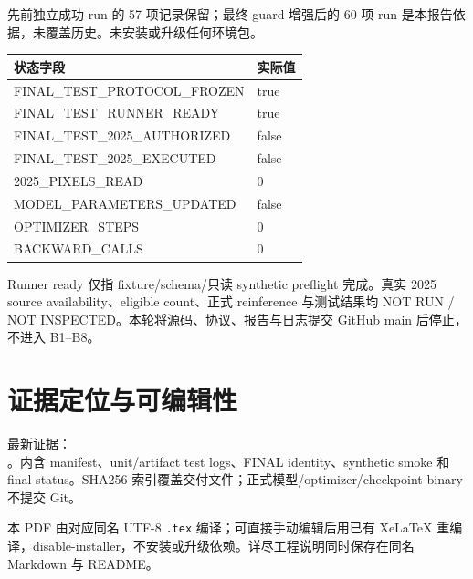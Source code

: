 \documentclass[UTF8,11pt,a4paper,fontset=windows]{ctexart}
\begin{document}
先前独立成功 run  的 57 项记录保留；最终 guard 增强后的 60 项 run 是本报告依据，未覆盖历史。未安装或升级任何环境包。

\begin{longtable}{p{111mm}l}
\textbf{状态字段} & \textbf{实际值}\\\hline
FINAL\_TEST\_PROTOCOL\_FROZEN & true\\
FINAL\_TEST\_RUNNER\_READY & true\\
FINAL\_TEST\_2025\_AUTHORIZED & false\\
FINAL\_TEST\_2025\_EXECUTED & false\\
2025\_PIXELS\_READ & 0\\
MODEL\_PARAMETERS\_UPDATED & false\\
OPTIMIZER\_STEPS & 0\\
BACKWARD\_CALLS & 0\\
\hline
\end{longtable}

Runner ready 仅指 fixture/schema/只读 synthetic preflight 完成。真实 2025 source availability、eligible count、正式 reinference 与测试结果均 NOT RUN / NOT INSPECTED。本轮将源码、协议、报告与日志提交 GitHub main 后停止，不进入 B1--B8。

\section{证据定位与可编辑性}
最新证据：\\
。内含 manifest、unit/artifact test logs、FINAL identity、synthetic smoke 和 final status。SHA256 索引覆盖交付文件；正式模型/optimizer/checkpoint binary 不提交 Git。

本 PDF 由对应同名 UTF-8 \texttt{.tex} 编译；可直接手动编辑后用已有 XeLaTeX 重编译，disable-installer，不安装或升级依赖。详尽工程说明同时保存在同名 Markdown 与 README。
\end{document}

